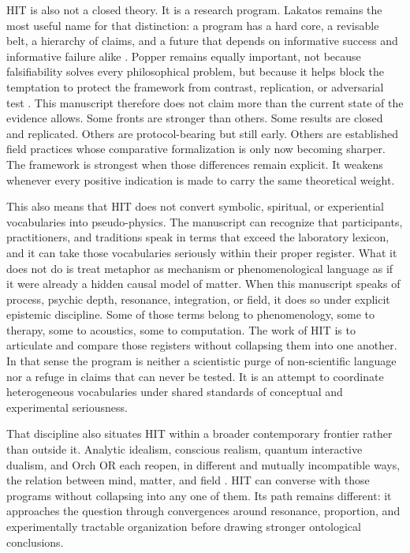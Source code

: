 HIT is also not a closed theory. It is a research program. Lakatos remains the most useful name for that distinction: a program has a hard core, a revisable belt, a hierarchy of claims, and a future that depends on informative success and informative failure alike \parencite{lakatos_1978}. Popper remains equally important, not because falsifiability solves every philosophical problem, but because it helps block the temptation to protect the framework from contrast, replication, or adversarial test \parencite{popper_1959}. This manuscript therefore does not claim more than the current state of the evidence allows. Some fronts are stronger than others. Some results are closed and replicated. Others are protocol-bearing but still early. Others are established field practices whose comparative formalization is only now becoming sharper. The framework is strongest when those differences remain explicit. It weakens whenever every positive indication is made to carry the same theoretical weight.

This also means that HIT does not convert symbolic, spiritual, or experiential vocabularies into pseudo-physics. The manuscript can recognize that participants, practitioners, and traditions speak in terms that exceed the laboratory lexicon, and it can take those vocabularies seriously within their proper register. What it does not do is treat metaphor as mechanism or phenomenological language as if it were already a hidden causal model of matter. When this manuscript speaks of process, psychic depth, resonance, integration, or field, it does so under explicit epistemic discipline. Some of those terms belong to phenomenology, some to therapy, some to acoustics, some to computation. The work of HIT is to articulate and compare those registers without collapsing them into one another. In that sense the program is neither a scientistic purge of non-scientific language nor a refuge in claims that can never be tested. It is an attempt to coordinate heterogeneous vocabularies under shared standards of conceptual and experimental seriousness.

That discipline also situates HIT within a broader contemporary frontier rather than outside it. Analytic idealism, conscious realism, quantum interactive dualism, and Orch OR each reopen, in different and mutually incompatible ways, the relation between mind, matter, and field \parencite{kastrup_2017a,kastrup_2017b,hoffman_2008,stapp_2005,hameroff_2014}. HIT can converse with those programs without collapsing into any one of them. Its path remains different: it approaches the question through convergences around resonance, proportion, and experimentally tractable organization before drawing stronger ontological conclusions.

